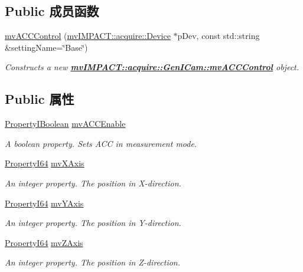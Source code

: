 \subsection*{Public 成员函数}
\begin{DoxyCompactItemize}
\item 
\hyperlink{classmv_i_m_p_a_c_t_1_1acquire_1_1_gen_i_cam_1_1mv_a_c_c_control_aa5f0f329b951ee4f1fe642a25bba16ed}{mv\+A\+C\+C\+Control} (\hyperlink{classmv_i_m_p_a_c_t_1_1acquire_1_1_device}{mv\+I\+M\+P\+A\+C\+T\+::acquire\+::\+Device} $\ast$p\+Dev, const std\+::string \&setting\+Name=\char`\"{}Base\char`\"{})
\begin{DoxyCompactList}\small\item\em Constructs a new {\bfseries \hyperlink{classmv_i_m_p_a_c_t_1_1acquire_1_1_gen_i_cam_1_1mv_a_c_c_control}{mv\+I\+M\+P\+A\+C\+T\+::acquire\+::\+Gen\+I\+Cam\+::mv\+A\+C\+C\+Control}} object. \end{DoxyCompactList}\end{DoxyCompactItemize}
\subsection*{Public 属性}
\begin{DoxyCompactItemize}
\item 
\hyperlink{group___common_interface_ga44f9437e24b21b6c93da9039ec6786aa}{Property\+I\+Boolean} \hyperlink{classmv_i_m_p_a_c_t_1_1acquire_1_1_gen_i_cam_1_1mv_a_c_c_control_afbca8b30efc29887d43618d899a9e877}{mv\+A\+C\+C\+Enable}
\begin{DoxyCompactList}\small\item\em A boolean property. Sets A\+C\+C in measurement mode. \end{DoxyCompactList}\item 
\hyperlink{group___common_interface_ga81749b2696755513663492664a18a893}{Property\+I64} \hyperlink{classmv_i_m_p_a_c_t_1_1acquire_1_1_gen_i_cam_1_1mv_a_c_c_control_a5c424aff9adf0c06a24fdb2ca9033799}{mv\+X\+Axis}
\begin{DoxyCompactList}\small\item\em An integer property. The position in X-\/direction. \end{DoxyCompactList}\item 
\hyperlink{group___common_interface_ga81749b2696755513663492664a18a893}{Property\+I64} \hyperlink{classmv_i_m_p_a_c_t_1_1acquire_1_1_gen_i_cam_1_1mv_a_c_c_control_aa6c57aea6cb05535752a02a37e8b6c14}{mv\+Y\+Axis}
\begin{DoxyCompactList}\small\item\em An integer property. The position in Y-\/direction. \end{DoxyCompactList}\item 
\hyperlink{group___common_interface_ga81749b2696755513663492664a18a893}{Property\+I64} \hyperlink{classmv_i_m_p_a_c_t_1_1acquire_1_1_gen_i_cam_1_1mv_a_c_c_control_a12a144f11b8ae650abcf7322de982c46}{mv\+Z\+Axis}
\begin{DoxyCompactList}\small\item\em An integer property. The position in Z-\/direction. \end{DoxyCompactList}\end{DoxyCompactItemize}
